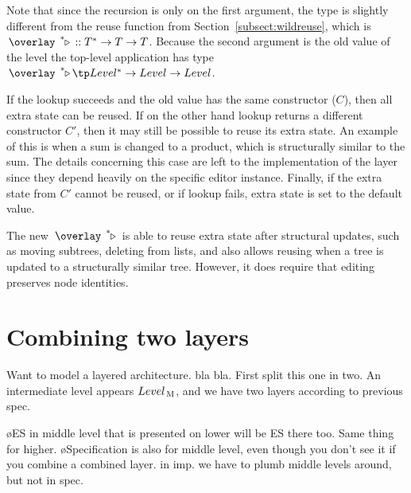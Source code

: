 Note that since the recursion is only on the first argument, the type is slightly different from the reuse function from Section~\ref{subsect:wildreuse}, which is $\reuzestar ::  T^* \to T \to T$. Because the second argument is the old value of the level the top-level application has type $\reuzestar \tp Level^* \to Level \to Level$.

If the lookup succeeds and the old value has the same constructor ($C$), then all extra state can be reused. If on the other hand lookup returns a different constructor $C'$, then it may still be possible to reuse its extra state. An example of this is when a sum is changed to a product, which is structurally similar to the sum. The details concerning this case are left to the implementation of the layer since they depend heavily on the specific editor instance. Finally, if the extra state from $C'$ cannot be reused, or if lookup fails, extra state is set to the default value.

The new $\reuzestar$ is able to reuse extra state after structural updates, such as moving subtrees, deleting from lists, and also allows reusing when a tree is updated to a structurally similar tree. However, it does require that editing preserves node identities. 




%
%






%																
%																
%																
\section{Combining two layers}  \label{sect:combinedExtra}


Want to model a layered architecture. bla bla. First split this one in two. An intermediate level appears $Level_{\, \mathrm M}$, and we have two layers according to previous spec. 

\bl
\o ES in middle level that is presented on lower will be ES there too. Same thing for higher.
\o Specification is also for middle level, even though you don't see it if you combine a  combined layer. in imp. we have to plumb middle levels around, but not in spec.
\el

